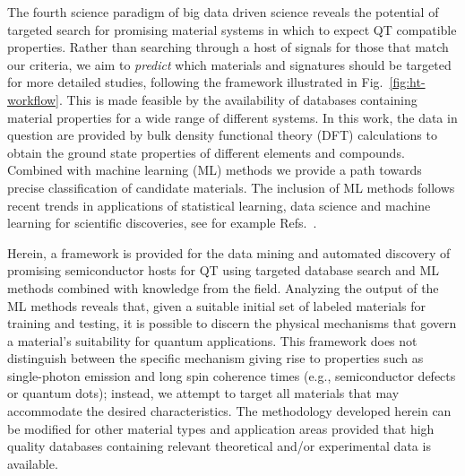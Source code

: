 \documentclass[superscriptaddress,
preprint,
 amsmath,amssymb,
 aps,
]{revtex4-2}
\begin{document}
The fourth science paradigm of big data driven science reveals the potential of targeted search for promising material systems in which to expect QT compatible properties. 
Rather than searching through a host of signals for those that match our criteria, we aim to \textit{predict} which materials and signatures should be targeted for more detailed studies, following the framework illustrated in Fig.~\ref{fig:ht-workflow}. 
This is made feasible by the availability of databases containing material properties for a wide range of different systems. In this work, the data in question are provided by bulk density functional theory (DFT) calculations to obtain the ground state properties of different elements and compounds. Combined with machine learning (ML) methods we provide a path towards precise classification of candidate materials. The inclusion of ML methods follows recent trends in applications of statistical learning, data science and machine learning for scientific discoveries, see for example Refs.~\cite{deiana2021,Carleo2019}. 

Herein, a framework is provided for the data mining and automated discovery of promising semiconductor hosts for QT using targeted database search and ML methods combined with knowledge from the field. 
Analyzing the output of the ML methods reveals that, given a suitable initial set of labeled materials for training and testing, it is possible to discern the physical mechanisms that govern a material's suitability for quantum applications.  
This framework does not distinguish between the specific mechanism giving rise to properties such as single-photon emission and long spin coherence times (e.g., semiconductor defects or quantum dots); instead, we attempt to target all materials that may accommodate the desired characteristics.  
The methodology developed herein can be modified for other material types and application areas provided that high quality databases containing relevant theoretical and/or experimental data is available. 
\end{document}
